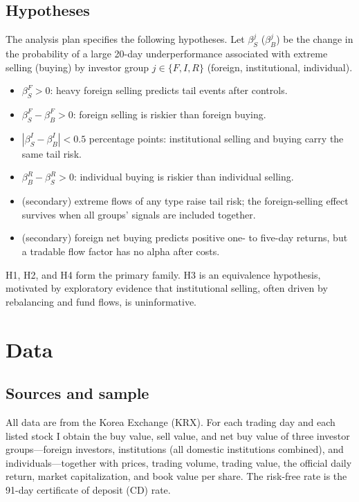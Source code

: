 \documentclass[11pt]{article}
\begin{document}
\subsection{Hypotheses}
The analysis plan specifies the following hypotheses. Let $\beta^j_S$ ($\beta^j_B$) be the change in the probability of
a large 20-day underperformance associated with extreme selling (buying) by investor group $j\in\{F,I,R\}$ (foreign,
institutional, individual).

\begin{itemize}\itemsep2pt
\item[H1] $\beta^F_S>0$: heavy foreign selling predicts tail events after controls.
\item[H2] $\beta^F_S-\beta^F_B>0$: foreign selling is riskier than foreign buying.
\item[H3] $|\beta^I_S-\beta^I_B|<0.5$ percentage points: institutional selling and buying carry the same tail risk.
\item[H4] $\beta^R_B-\beta^R_S>0$: individual buying is riskier than individual selling.
\item[H5--H6] (secondary) extreme flows of any type raise tail risk; the foreign-selling effect survives when all
groups' signals are included together.
\item[H7--H8] (secondary) foreign net buying predicts positive one- to five-day returns, but a tradable flow factor has
no alpha after costs.
\end{itemize}
H1, H2, and H4 form the primary family. H3 is an equivalence hypothesis, motivated by exploratory evidence that
institutional selling, often driven by rebalancing and fund flows, is uninformative.

\section{Data}\label{sec:data}

\subsection{Sources and sample}
All data are from the Korea Exchange (KRX). For each trading day and each listed stock I obtain the buy value, sell
value, and net buy value of three investor groups---foreign investors, institutions (all domestic institutions
combined), and individuals---together with prices, trading volume, trading value, the official daily return, market
capitalization, and book value per share. The risk-free rate is the 91-day certificate of deposit (CD) rate.
\end{document}
